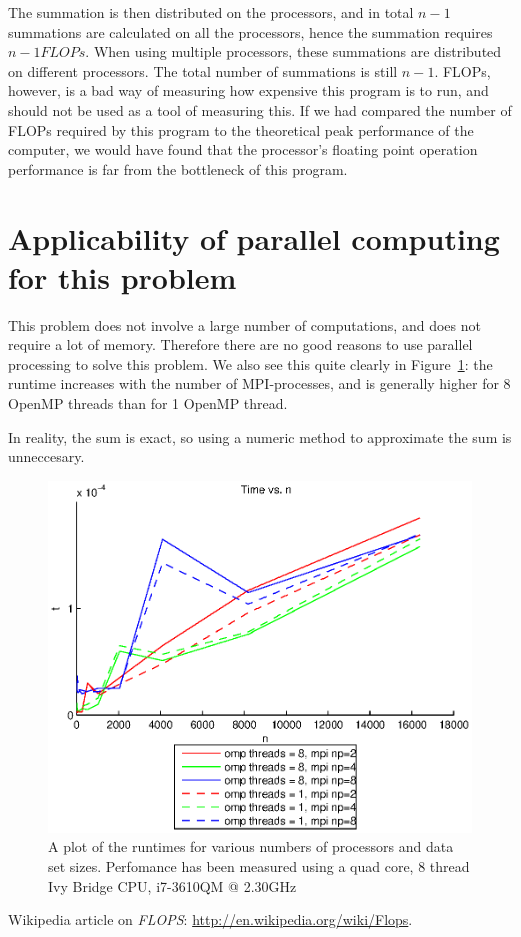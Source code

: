 The summation is then distributed on the processors, and in total $n-1$ summations are calculated on all the processors, hence the summation requires $n-1 FLOPs$. When using multiple processors, these summations are distributed on different processors. The total number of summations is still $n-1$.
FLOPs, however, is a bad way of measuring how expensive this program is to run, and should not be used as a tool of measuring this. If we had compared the number of FLOPs required by this program to the theoretical peak performance of the computer, we would have found that the processor's floating point operation performance is far from the bottleneck of this program.


\section{Applicability of parallel computing for this problem} %
\label{sec:applicability_of_parallel_computing_for_this_problem}
This problem does not involve a large number of computations, and does not require a lot of memory. Therefore there are no good reasons to use parallel processing to solve this problem. We also see this quite clearly in Figure~\ref{fig:runtime}: the runtime increases with the number of MPI-processes, and is generally higher for 8 OpenMP threads than for 1 OpenMP thread.

In reality, the sum is exact, so using a numeric method to approximate the sum is unneccesary.

\begin{figure}[H]
  \centering
  \includegraphics[]{graphics/runtime.eps}
  \caption{A plot of the runtimes for various numbers of processors and data set sizes. Perfomance has been measured using a quad core, 8 thread Ivy Bridge CPU, i7-3610QM @ 2.30GHz}
  \label{fig:runtime}
\end{figure}

\begin{thebibliography}{1}
   Wikipedia article on \emph{FLOPS}: \url{http://en.wikipedia.org/wiki/Flops}.
\end{thebibliography}


